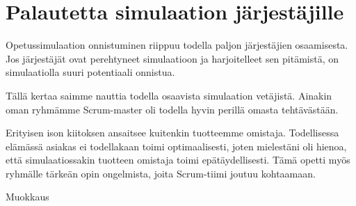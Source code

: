 \documentclass[a4paper]{article}
\begin{document}
\section{Palautetta simulaation järjestäjille}

Opetussimulaation onnistuminen riippuu todella paljon järjestäjien osaamisesta. Jos järjestäjät ovat perehtyneet simulaatioon ja harjoitelleet sen pitämistä, on simulaatiolla suuri potentiaali onnistua.

Tällä kertaa saimme nauttia todella osaavista simulaation vetäjistä. Ainakin oman ryhmämme Scrum-master oli todella hyvin perillä omasta tehtävästään.

Erityisen ison kiitoksen ansaitsee kuitenkin tuotteemme omistaja. Todellisessa elämässä asiakas ei todellakaan toimi optimaalisesti, joten mielestäni oli hienoa, että simulaatiossakin tuotteen omistaja toimi epätäydellisesti. Tämä opetti myös ryhmälle tärkeän opin ongelmista, joita Scrum-tiimi joutuu kohtaamaan.

Muokkaus



\end{document}
